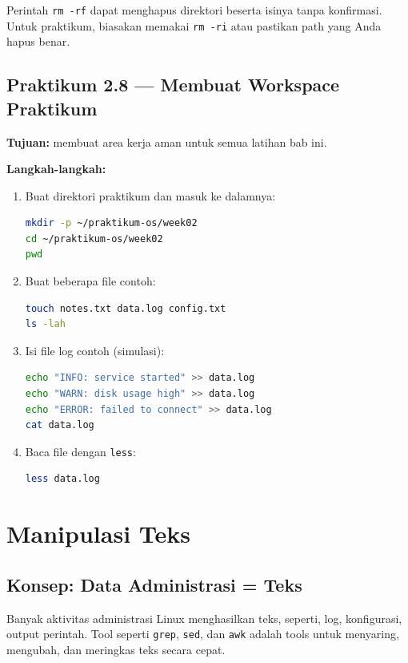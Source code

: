 \begin{warningbox}
Perintah \texttt{rm -rf} dapat menghapus direktori beserta isinya tanpa konfirmasi. Untuk praktikum, biasakan memakai \texttt{rm -ri}
atau pastikan path yang Anda hapus benar.
\end{warningbox}

\subsection*{Praktikum 2.8 --- Membuat Workspace Praktikum}
\textbf{Tujuan:} membuat area kerja aman untuk semua latihan bab ini.

\textbf{Langkah-langkah:}
\begin{enumerate}
    \item Buat direktori praktikum dan masuk ke dalamnya:
\begin{lstlisting}[language=bash, caption={Membuat workspace praktikum}]
mkdir -p ~/praktikum-os/week02
cd ~/praktikum-os/week02
pwd
\end{lstlisting}

    \item Buat beberapa file contoh:
\begin{lstlisting}[language=bash, caption={Membuat file contoh}]
touch notes.txt data.log config.txt
ls -lah
\end{lstlisting}

    \item Isi file log contoh (simulasi):
\begin{lstlisting}[language=bash, caption={Mengisi file log contoh}]
echo "INFO: service started" >> data.log
echo "WARN: disk usage high" >> data.log
echo "ERROR: failed to connect" >> data.log
cat data.log
\end{lstlisting}

    \item Baca file dengan \texttt{less}:
\begin{lstlisting}[language=bash, caption={Membaca file dengan less}]
less data.log
\end{lstlisting}
\end{enumerate}

\section{Manipulasi Teks}
\label{sec:text-manipulation}

\subsection*{Konsep: Data Administrasi = Teks}
Banyak aktivitas administrasi Linux menghasilkan teks, seperti, log, konfigurasi, output perintah. Tool seperti \texttt{grep}, \texttt{sed}, dan \texttt{awk}
adalah tools untuk menyaring, mengubah, dan meringkas teks secara cepat.

